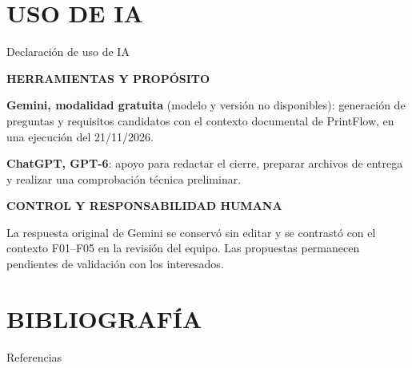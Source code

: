 \documentclass[aspectratio=169,12pt]{beamer}
\newcommand{\etiqueta}[1]{{\fontsize{7.5}{9}\selectfont\bfseries\color{Accent}#1\par}}
\newcommand{\fuentesactuales}{}
\newcommand{\fuentesdiapositiva}[1]{\gdef\fuentesactuales{#1}}
\begin{document}
\section{USO DE IA}
\begin{frame}[t,shrink=14]{Declaración de uso de IA}
\fuentesdiapositiva{Registros: evidencias/ejecucion.txt y evidencias/revision-respuesta.txt}
\vspace{1mm}
\etiqueta{HERRAMIENTAS Y PROPÓSITO}
\vspace{1.5mm}
{\fontsize{10}{13}\selectfont
\textbf{Gemini, modalidad gratuita} (modelo y versión no disponibles): generación de preguntas y requisitos candidatos con el contexto documental de PrintFlow, en una ejecución del 21/11/2026.\par}
\vspace{3mm}
{\fontsize{10}{13}\selectfont
\textbf{ChatGPT, GPT-6}: apoyo para redactar el cierre, preparar archivos de entrega y realizar una comprobación técnica preliminar.\par}
\vspace{4mm}
\etiqueta{CONTROL Y RESPONSABILIDAD HUMANA}
\vspace{1.5mm}
{\fontsize{10}{13}\selectfont
La respuesta original de Gemini se conservó sin editar y se contrastó con el contexto F01--F05 en la revisión del equipo. Las propuestas permanecen pendientes de validación con los interesados.\par}
\vspace{2.5mm}

\vfill
\vspace{1mm}
\end{frame}

\section{BIBLIOGRAFÍA}
\begin{frame}[t]{Referencias}
\fuentesdiapositiva{}
\renewcommand*{\bibfont}{\scriptsize}
\setlength{\bibitemsep}{1.5mm}
\printbibliography[heading=none]
\end{frame}
\end{document}
